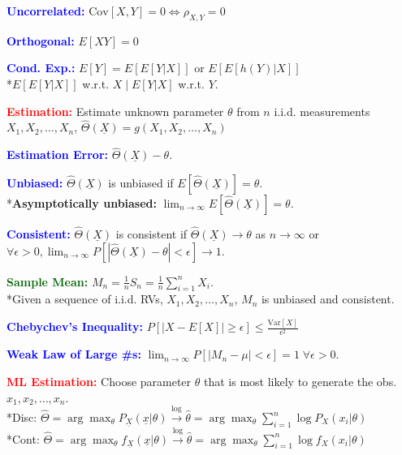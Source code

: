 \documentclass[5pt]{extarticle} %
\begin{document}
\begin{paracol}{3}
{    \textcolor{blue}{\textbf{Uncorrelated:}} $\text{Cov}[X, Y] = 0 \Leftrightarrow \rho_{X,Y} = 0$

    \textcolor{blue}{\textbf{Orthogonal:}} $E[XY] = 0$

    \textcolor{blue}{\textbf{Cond. Exp.:}} $E[Y] = E[E[Y|X]]$ or $E[E[h(Y)|X]]$ \\
    *$E[E[Y|X]]$ w.r.t. $X \mid E[Y|X]$ w.r.t. $Y$. 

    \textcolor{red}{\textbf{Estimation:}} Estimate unknown parameter $\theta$ from $n$ i.i.d. measurements $X_1, X_2, \ldots, X_n$, $\hat{\Theta}(\underline{X}) = g(X_1, X_2, \ldots, X_n)$

    \textcolor{blue}{\textbf{Estimation Error:}} $\hat{\Theta}(\underline{X}) - \theta$. 

    \textcolor{blue}{\textbf{Unbiased:}} $\hat{\Theta}(\underline{X})$ is unbiased if $E[\hat{\Theta}(\underline{X})] = \theta$. \\
    *\textbf{Asymptotically unbiased:} $\lim_{n \to \infty} E[\hat{\Theta}(\underline{X})] = \theta$.

    \textcolor{blue}{\textbf{Consistent:}} $\hat{\Theta}(\underline{X})$ is consistent if $\hat{\Theta}(\underline{X}) \rightarrow \theta$ as $n \to \infty$ or $\forall \epsilon >0, \lim_{n \to \infty} P[|\hat{\Theta}(\underline{X}) - \theta| < \epsilon] \rightarrow 1$.

    \textcolor{darkgreen}{\textbf{Sample Mean:}} $M_n = \frac{1}{n} S_n = \frac{1}{n} \sum_{i=1}^n X_i$. \\
    *Given a sequence of i.i.d. RVs, $X_1, X_2, \ldots, X_n$, $M_n$ is unbiased and consistent.

    \textcolor{blue}{\textbf{Chebychev's Inequality:}} $P[|X - E[X]| \geq \epsilon] \leq \frac{\text{Var}[X]}{\epsilon^2}$

    \textcolor{blue}{\textbf{Weak Law of Large \#s:}} $\lim_{n \to \infty} P[|M_n - \mu| < \epsilon] = 1 \; \forall \epsilon > 0$.

    \textcolor{red}{\textbf{ML Estimation:}} Choose parameter $\theta$ that is most likely to generate the obs. $x_1, x_2, \ldots, x_n$. \\
    *Disc: $\hat{\Theta} = \arg \max_\theta P_{\underline{X}} (\underline{x} | \theta) \overset{\text{log}}{\rightarrow} \hat{\theta} = \arg \max_\theta \sum_{i=1}^n \log P_X(x_i | \theta)$ \\
    *Cont: $\hat{\Theta} = \arg \max_\theta f_{\underline{X}} (\underline{x} | \theta) \overset{\text{log}}{\rightarrow} \hat{\theta} = \arg \max_\theta \sum_{i=1}^n \log f_X(x_i | \theta)$

}
\end{paracol}
\end{document}
